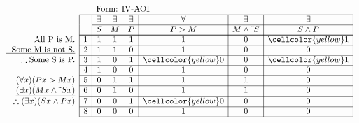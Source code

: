 \documentclass[10pt,legalpaper,landscape,cmtt]{article}
\begin{document}
{\begin{minipage}[t]{3.25in}
	\)
\end{minipage}\begin{minipage}[t]{3.25in}
	\(
	\begin{array}{r|c|ccc|c|c|c|}
		\multicolumn{2}{c}{}&\multicolumn{6}{l}{\mbox{Form: IV-AOI}} \\ \cline{2-8}
		\hspace{1in}	&	& \exists & \exists & \exists & \forall & \exists & \exists\\ \cline{3-8}
		&	& S & M & P &  P > M  &  M \wedge \tilde~S  &  S \wedge P \\ \cline{2-8} \cline{2-8}
		\phantom{\therefore}\mbox{All P is M.}   & 1 & 1 & 1 & 1 &   1   &   0   &   \cellcolor{yellow} 1  \\ \cline{2-8}
		\underline{\phantom{\therefore}\mbox{Some M is not S.}}   & 2 & 1 & 1 & 0 &   1   &   0   &   0  \\ \cline{2-8}
		\therefore \mbox{Some S is P.}   & 3 & 1 & 0 & 1 &   \cellcolor{yellow} 0   &   0   &   \cellcolor{yellow} 1  \\ \cline{2-8}
		& 4 & 1 & 0 & 0 &   1   &   0   &   0  \\ \cline{2-8}
		(\forall x)(Px > Mx)   & 5 & 0 & 1 & 1 &   1   &   1   &   0  \\ \cline{2-8}
		\underline{(\exists x)(Mx \wedge \tilde~Sx)}   & 6 & 0 & 1 & 0 &   1   &   1   &   0  \\ \cline{2-8}
		\therefore(\exists x)(Sx \wedge Px)   & 7 & 0 & 0 & 1 &   \cellcolor{yellow} 0   &   0   &   0  \\ \cline{2-8}
		& 8 & 0 & 0 & 0 &   1   &   0   &   0   \\ \cline{2-8}\cline{2-8} 
	\end{array}
	\)
\end{minipage}

}
\end{document}
